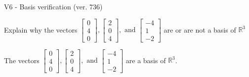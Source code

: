 \begin{exercise}
  \begin{exerciseTitle}V6 - Basis verification (ver. 736)\end{exerciseTitle}
  \begin{exerciseStatement}
    Explain why the vectors \(\left[\begin{array}{r}
0 \\
4 \\
0
\end{array}\right] , \left[\begin{array}{r}
2 \\
0 \\
4
\end{array}\right] , \text{ and } \left[\begin{array}{r}
-4 \\
1 \\
-2
\end{array}\right]\) are or are not a basis of \(\mathbb{R}^3\)	


  \end{exerciseStatement}
  \begin{exerciseAnswer}
   The vectors \(\left[\begin{array}{r}
0 \\
4 \\
0
\end{array}\right] , \left[\begin{array}{r}
2 \\
0 \\
4
\end{array}\right] , \text{ and } \left[\begin{array}{r}
-4 \\
1 \\
-2
\end{array}\right]\) 
  	 are  a basis of \(\mathbb{R}^3\).
  


  \end{exerciseAnswer}
\end{exercise}